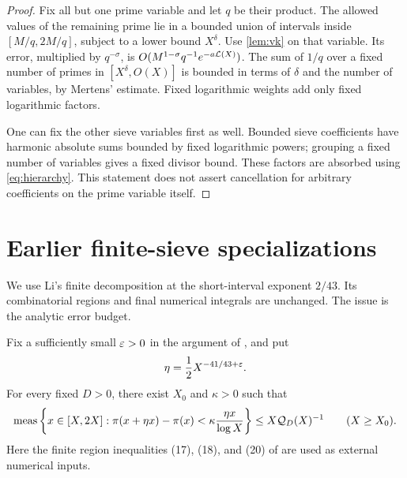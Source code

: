 \begin{proof}
Fix all but one prime variable and let $q$ be their product.
The allowed values of the remaining prime lie in a bounded union of
intervals inside $[M/q,2M/q]$, subject to a lower bound $X^\delta$.
Use \cref{lem:vk} on that variable. Its error, multiplied by $q^{-\sigma}$,
is $O(M^{1-\sigma}q^{-1}e^{-a\mathcal L(X)})$.
The sum of $1/q$ over a fixed number of primes in $[X^\delta,O(X)]$ is
bounded in terms of $\delta$ and the number of variables, by Mertens'
estimate. Fixed logarithmic weights add only fixed logarithmic factors.

One can fix the other sieve variables first as well. Bounded sieve
coefficients have harmonic absolute sums bounded by fixed logarithmic
powers; grouping a fixed number of variables gives a fixed divisor
bound. These factors are absorbed using \eqref{eq:hierarchy}.
This statement does not assert cancellation for arbitrary coefficients
on the prime variable itself.
\end{proof}

\section{Earlier finite-sieve specializations}\label{sec:earlier-sieves}

We use Li's finite decomposition at the short-interval exponent $2/43$.
Its combinatorial regions and final numerical integrals are unchanged.
The issue is the analytic error budget.

\begin{proposition}\label{prop:finiteQ}
Fix a sufficiently small $\varepsilon>0$ in the argument of \cite{LiI}, and put
\[
            \eta=\frac12X^{-41/43+\varepsilon}.
\]
For every fixed $D>0$, there exist $X_0$ and $\kappa>0$ such that
\begin{equation}\label{eq:sieveQ}
 \operatorname{meas}\left\{x\in[X,2X]:
   \pi(x+\eta x)-\pi(x)<\kappa\frac{\eta x}{\log X}\right\}
 \le X\mathcal Q_D(X)^{-1}
 \qquad (X\ge X_0).
\end{equation}
Here the finite region inequalities (17), (18), and (20) of \cite{LiI}
are used as external numerical inputs.
\end{proposition}

